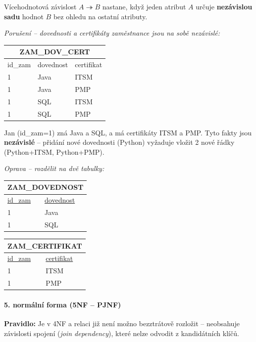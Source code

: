 Vícehodnotová závislost $A \twoheadrightarrow B$ nastane, když jeden atribut $A$ určuje \textbf{nezávislou sadu}
hodnot $B$ bez ohledu na ostatní atributy.

\smallskip
\textit{Porušení -- dovednosti a certifikáty zaměstnance jsou na sobě nezávislé:}
\begin{center}\footnotesize
\begin{tabular}{lll}
\toprule
\multicolumn{3}{c}{\textbf{ZAM\_DOV\_CERT}} \\
\midrule
id\_zam & dovednost & certifikat \\
\midrule
1 & Java & ITSM \\
1 & Java & PMP \\
1 & SQL  & ITSM \\
1 & SQL  & PMP \\
\bottomrule
\end{tabular}
\end{center}

Jan (id\_zam=1) zná Java a SQL, a má certifikáty ITSM a PMP. Tyto fakty jsou \textbf{nezávislé} --
přidání nové dovednosti (Python) vyžaduje vložit 2 nové řádky (Python+ITSM, Python+PMP).

\textit{Oprava -- rozdělit na dvě tabulky:}
\begin{center}\footnotesize
\begin{tabular}{ll}
\toprule
\multicolumn{2}{c}{\textbf{ZAM\_DOVEDNOST}} \\
\midrule
\underline{id\_zam} & \underline{dovednost} \\
1 & Java \\ 1 & SQL \\
\bottomrule
\end{tabular}
\quad
\begin{tabular}{ll}
\toprule
\multicolumn{2}{c}{\textbf{ZAM\_CERTIFIKAT}} \\
\midrule
\underline{id\_zam} & \underline{certifikat} \\
1 & ITSM \\ 1 & PMP \\
\bottomrule
\end{tabular}
\end{center}

\paragraph{5. normální forma (5NF -- PJNF)}
\textbf{Pravidlo:} Je v 4NF a relaci již není možno bezztrátově rozložit -- neobsahuje závislosti spojení (\textit{join dependency}), které nelze odvodit z kandidátních klíčů.

